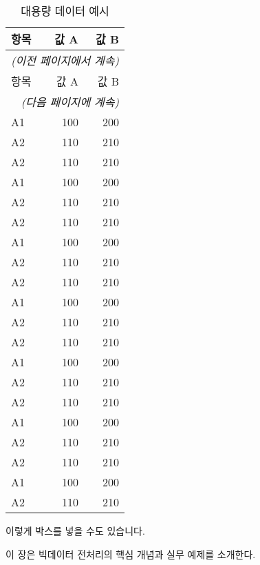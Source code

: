 \begin{longtable}{lrr}
  \caption{대용량 데이터 예시} \\
  \toprule
  항목 & 값 A & 값 B \\ \midrule
  \endfirsthead
  \multicolumn{3}{c}{\textit{(이전 페이지에서 계속)}} \\ \toprule
  항목 & 값 A & 값 B \\ \midrule
  \endhead
  \midrule \multicolumn{3}{r}{\textit{(다음 페이지에 계속)}} \\ \bottomrule
  \endfoot
  \bottomrule
  \endlastfoot
  A1 & 100 & 200 \\
  A2 & 110 & 210 \\
  A2 & 110 & 210 \\
  A1 & 100 & 200 \\
  A2 & 110 & 210 \\
  A2 & 110 & 210 \\
  A1 & 100 & 200 \\
  A2 & 110 & 210 \\
  A2 & 110 & 210 \\
  A1 & 100 & 200 \\
  A2 & 110 & 210 \\
  A2 & 110 & 210 \\
  A1 & 100 & 200 \\
  A2 & 110 & 210 \\
  A2 & 110 & 210 \\
  A1 & 100 & 200 \\
  A2 & 110 & 210 \\
  A2 & 110 & 210 \\
  A1 & 100 & 200 \\
  A2 & 110 & 210 \\
\end{longtable}

이렇게 박스를 넣을 수도 있습니다.
\begin{tcolorbox}[colback=gray!10, colframe=gray!80, boxrule=0.5pt, left=1em, right=1em]
이 장은 빅데이터 전처리의 핵심 개념과 실무 예제를 소개한다.
\end{tcolorbox}